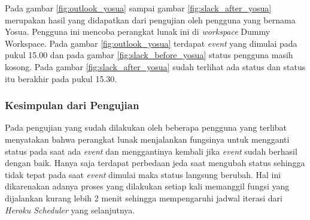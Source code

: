 Pada gambar \ref{fig:outlook_yosua} sampai gambar \ref{fig:slack_after_yosua} merupakan hasil yang didapatkan dari pengujian oleh pengguna yang bernama Yosua. Pengguna ini mencoba perangkat lunak ini di \textit{workspace} Dummy Workspace. Pada gambar \ref{fig:outlook_yosua} terdapat \textit{event} yang dimulai pada pukul 15.00 dan pada gambar \ref{fig:slack_before_yosua} status pengguna masih kosong. Pada gambar \ref{fig:slack_after_yosua} sudah terlihat ada status dan status itu berakhir pada pukul 15.30. 

\subsubsection{Kesimpulan dari Pengujian}
Pada pengujian yang sudah dilakukan oleh beberapa pengguna yang terlibat menyatakan bahwa perangkat lunak menjalankan fungsinya untuk mengganti status pada saat ada \textit{event} dan menggantinya kembali jika \textit{event} sudah berhasil dengan baik. Hanya saja terdapat perbedaan jeda saat mengubah status sehingga tidak tepat pada saat \textit{event} dimulai maka status langsung berubah. Hal ini dikarenakan adanya proses yang dilakukan setiap kali memanggil fungsi yang dijalankan kurang lebih 2 menit sehingga mempengaruhi jadwal iterasi dari \textit{Heroku Scheduler} yang selanjutnya. 